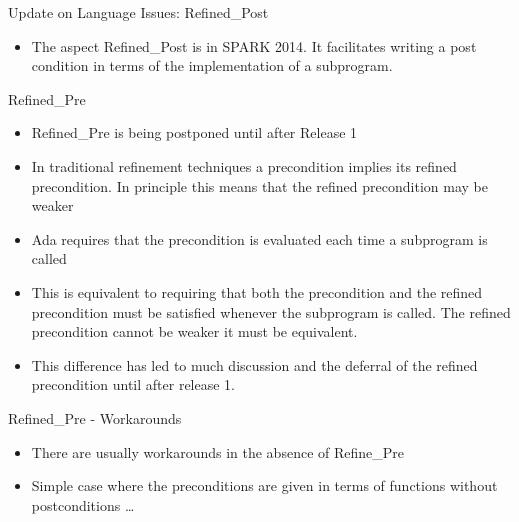 \documentclass{beamer}
\begin{document}
\begin{frame}{Update on Language Issues: Refined\_Post}

  \begin{itemize}
  \item The aspect Refined\_Post is in SPARK 2014.  It facilitates
    writing a post condition in terms of the implementation of a subprogram. 
  \end{itemize}
 
\end{frame}

\begin{frame}{Refined\_Pre}

  \begin{itemize}
  \item Refined\_Pre is being postponed until after Release 1
  \item In traditional refinement techniques a precondition implies
    its refined precondition.  In principle this means that the
    refined precondition may be weaker
  \item Ada requires that the precondition is evaluated each time a
    subprogram is called
  \item This is equivalent to requiring that both the precondition and
    the refined precondition must be satisfied whenever the subprogram
    is called.  The refined precondition cannot be weaker it must be equivalent.
  \item This difference has led to much discussion and the deferral of
    the refined precondition until after release 1.
  \end{itemize}
 
\end{frame}

\begin{frame}{Refined\_Pre - Workarounds}

  \begin{itemize}
    \item There are usually workarounds in the absence of Refine\_Pre
    \item Simple case where the preconditions are given in terms of
      functions without postconditions \ldots
  \end{itemize}

\end{frame}
\end{document}
